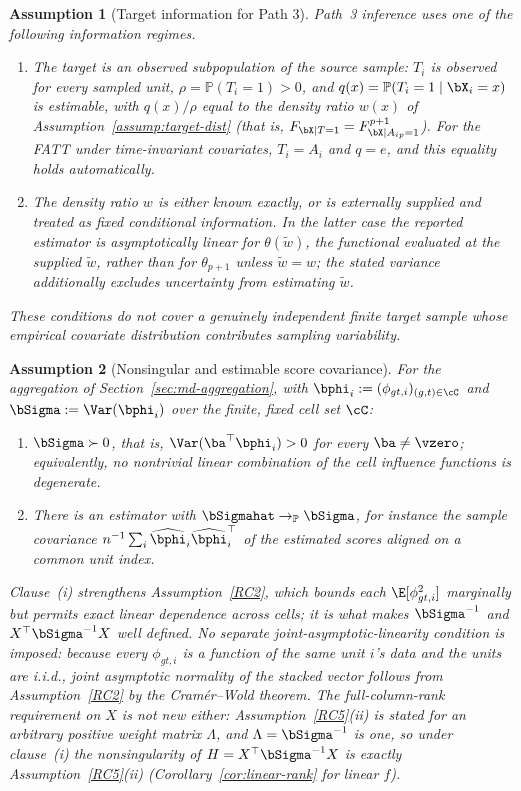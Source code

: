 \documentclass{article}
\newtheorem{assumption}{Assumption}
\renewcommand{\P}{\mathbb{P}}
\begin{document}
\begin{assumption}[Target information for Path 3]\label{RC10}
Path~3 inference uses one of the following information regimes.

\begin{enumerate}
\item[(i)] The target is an observed subpopulation of the source sample: $T_i$ is observed for every sampled unit, $\rho=\P(T_i=1)>0$, and $q(x)=\P(T_i=1\mid\bX_i=x)$ is estimable, with $q(x)/\rho$ equal to the density ratio $w(x)$ of Assumption~\ref{assump:target-dist} (that is, $F_{\bX\mid T=1}=F_{\bX\mid A_{ip}=1}^{p+1}$). For the FATT under time-invariant covariates, $T_i=A_i$ and $q=e$, and this equality holds automatically.
\item[(iii)] The density ratio $w$ is either known exactly, or is externally supplied and treated as fixed conditional information. In the latter case the reported estimator is asymptotically linear for $\theta(\widetilde w)$, the functional evaluated at the supplied $\widetilde w$, rather than for $\theta_{p+1}$ unless $\widetilde w=w$; the stated variance additionally excludes uncertainty from estimating $\widetilde w$.
\end{enumerate}

These conditions do not cover a genuinely independent finite target sample whose empirical covariate distribution contributes sampling variability.
\end{assumption}

\begin{assumption}[Nonsingular and estimable score covariance]\label{RC11}
For the aggregation of Section~\ref{sec:md-aggregation}, with $\bphi_i := (\phi_{gt,i})_{(g,t)\in\cC}$ and $\bSigma := \Var(\bphi_i)$ over the finite, fixed cell set $\cC$:
\begin{enumerate}
\item[(i)] $\bSigma \succ 0$, that is, $\Var(\ba^{\top}\bphi_i) > 0$ for every $\ba \neq \vzero$; equivalently, no nontrivial linear combination of the cell influence functions is degenerate.
\item[(ii)] There is an estimator with $\bSigmahat \to_{\P} \bSigma$, for instance the sample covariance $n^{-1}\sum_i \widehat{\bphi}_i\widehat{\bphi}_i^{\top}$ of the estimated scores aligned on a common unit index.
\end{enumerate}
Clause~(i) strengthens Assumption~\ref{RC2}, which bounds each $\E[\phi_{gt,i}^2]$ marginally but permits exact linear dependence across cells; it is what makes $\bSigma^{-1}$ and $X^{\top}\bSigma^{-1}X$ well defined. No separate joint-asymptotic-linearity condition is imposed: because every $\phi_{gt,i}$ is a function of the same unit $i$'s data and the units are i.i.d., joint asymptotic normality of the stacked vector follows from Assumption~\ref{RC2} by the Cram\'er--Wold theorem. The full-column-rank requirement on $X$ is not new either: Assumption~\ref{RC5}(ii) is stated for an arbitrary positive weight matrix $\Lambda$, and $\Lambda = \bSigma^{-1}$ is one, so under clause~(i) the nonsingularity of $H = X^{\top}\bSigma^{-1}X$ is exactly Assumption~\ref{RC5}(ii) (Corollary~\ref{cor:linear-rank} for linear $f$).
\end{assumption}
\end{document}
